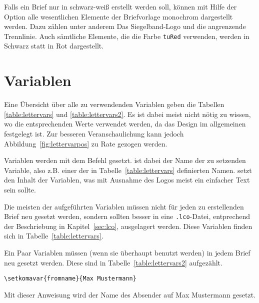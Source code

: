 Falls ein Brief nur in schwarz-weiß erstellt werden soll, können mit Hilfe
der Option  alle wesentlichen Elemente der Briefvorlage monochrom
dargestellt werden. Dazu zählen unter anderem Das Siegelband-Logo und die
angrenzende Trennlinie.
Auch sämtliche Elemente, die die Farbe \texttt{tuRed} verwenden, werden
in Schwarz statt in Rot dargestellt.

\section{Variablen}\label{sec:lettervars}

Eine Übersicht über alle zu verwendenden Variablen geben die
Tabellen \ref{table:lettervars} und \ref{table:lettervars2}.
Es ist dabei meist nicht nötig zu wissen,
wo die entsprechenden Werte verwendet werden, da das Design im allgemeinen
festgelegt ist. Zur besseren Veranschaulichung kann jedoch
Abbildung~\ref{fig:lettervarpos} zu Rate gezogen werden.

\begin{Declaration}
\end{Declaration}

Variablen werden mit dem Befehl  gesetzt.
 ist dabei der Name der zu setzenden Variable, also z.B. einer der in
Tabelle~\ref{table:lettervars} definierten Namen.  setzt den
Inhalt der Variablen, was mit Ausnahme des Logos meist ein einfacher
Text sein sollte.

Die meisten der aufgeführten Variablen müssen nicht für jeden zu erstellenden
Brief neu gesetzt werden, sondern sollten besser in eine \texttt{.lco}-Datei,
entprechend der Beschriebung in Kapitel~\ref{sec:lco}, ausgelagert werden.
Diese Variablen finden sich in Tabelle~\ref{table:lettervars}.

Ein Paar Variablen müssen (wenn sie überhaupt benutzt werden) in jedem Brief
neu gesetzt werden. Diese sind in Tabelle~\ref{table:lettervars2} aufgezählt.

\begin{example}
\begin{lstlisting}
\setkomavar{fromname}{Max Mustermann}
\end{lstlisting}
Mit dieser Anweisung wird der Name des Absender auf \glqq Max Mustermann\grqq
gesetzt.
\end{example}


